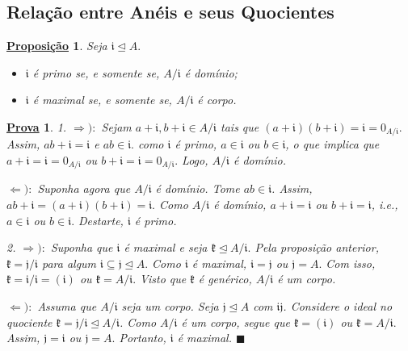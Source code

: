 \documentclass{article}
\newtheorem*{prop*}{\underline{Proposi\c c\~ao}}
\newtheorem*{proof*}{\underline{Prova}}
\renewcommand\qedsymbol{$\blacksquare$}
\begin{document}
\subsection{Relação entre Anéis e seus Quocientes}
 \begin{prop*}
  Seja \(\mathfrak{i}\trianglelefteq{A}.\)
 \begin{itemize}
  \item[1)] \(\mathfrak{i}\) é primo se, e somente se, \(A/\mathfrak{i}\) é domínio;
  \item[2)] \(\mathfrak{i}\) é maximal se, e somente se, \(A/\mathfrak{i}\) é corpo.
 \end{itemize}
 \end{prop*}
 \begin{proof*}
  1. \(\Rightarrow ):\) Sejam \(a+\mathfrak{i}, b+\mathfrak{i}\in A/\mathfrak{i}\) tais que \((a+\mathfrak{i})(b+\mathfrak{i})=\mathfrak{i}=0_{A/\mathfrak{i}}.\) Assim,
 \(ab+\mathfrak{i} = \mathfrak{i}\) e \(ab\in \mathfrak{i}.\) como \(\mathfrak{i}\) é primo, \(a\in \mathfrak{i}\) ou \(b\in \mathfrak{i}\), o que implica que
 \(a+\mathfrak{i} = \mathfrak{i} = 0_{A/\mathfrak{i}}\) ou \(b+\mathfrak{i} = \mathfrak{i} = 0_{A/\mathfrak{i}}.\) Logo, \(A/\mathfrak{i}\) é domínio.

 \(\Leftarrow ):\) Suponha agora que \(A/\mathfrak{i}\) é domínio. Tome \(ab\in \mathfrak{i}\). Assim, \(ab + \mathfrak{i} = (a+\mathfrak{i})(b+\mathfrak{i}) = \mathfrak{i}.\)
Como \(A/\mathfrak{i}\) é domínio, \(a+\mathfrak{i} = \mathfrak{i}\) ou \(b+\mathfrak{i} = \mathfrak{i}\), i.e., \(a\in \mathfrak{i}\) ou \(b\in \mathfrak{i}.\) Destarte, \(\mathfrak{i}\) é primo.

  2. \(\Rightarrow ):\) Suponha que \(\mathfrak{i}\) é maximal e seja \(\mathfrak{k}\trianglelefteq{A/\mathfrak{i}}.\) Pela proposição anterior,
 \(\mathfrak{k} = \mathfrak{j}/\mathfrak{i}\) para algum \(\mathfrak{i}\subseteq \mathfrak{j}\trianglelefteq{A}.\) Como \(\mathfrak{i}\) é maximal,
 \(\mathfrak{i}=\mathfrak{j}\) ou \(\mathfrak{j} = A.\) Com isso, \(\mathfrak{k} = \mathfrak{i}/\mathfrak{i} = (\mathfrak{i})\) ou \(\mathfrak{k} = A/\mathfrak{i}.\) 
 Visto que \(\mathfrak{k}\) é genérico, \(A/\mathfrak{i}\) é um corpo.

 \(\Leftarrow ):\) Assuma que \(A/\mathfrak{i}\) seja um corpo. Seja \(\mathfrak{j}\trianglelefteq{A}\) com \(\mathfrak{i}\mathfrak{j}\).
Considere o ideal no quociente \(\mathfrak{k} = \mathfrak{j}/\mathfrak{i}\trianglelefteq{A/\mathfrak{i}}\). Como \(A/\mathfrak{i}\) é um corpo,
segue que \(\mathfrak{k} = (\mathfrak{i})\) ou \(\mathfrak{k} = A/\mathfrak{i}.\) Assim, \(\mathfrak{j} = \mathfrak{i}\) ou \(\mathfrak{j} = A.\)
Portanto, \(\mathfrak{i}\) é maximal. \qedsymbol
 \end{proof*}
\end{document}
